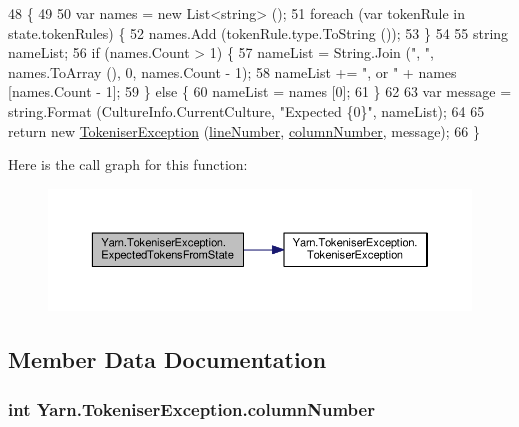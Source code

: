 \begin{DoxyCode}
48                                                                                                            
                       \{
49 
50             var names = \textcolor{keyword}{new} List<string> ();
51             \textcolor{keywordflow}{foreach} (var tokenRule \textcolor{keywordflow}{in} state.tokenRules) \{
52                 names.Add (tokenRule.type.ToString ());
53             \}
54 
55             \textcolor{keywordtype}{string} nameList;
56             \textcolor{keywordflow}{if} (names.Count > 1) \{
57                 nameList = String.Join (\textcolor{stringliteral}{", "}, names.ToArray (), 0, names.Count - 1);
58                 nameList += \textcolor{stringliteral}{", or "} + names [names.Count - 1];
59             \} \textcolor{keywordflow}{else} \{
60                 nameList = names [0];
61             \}
62 
63             var message = string.Format (CultureInfo.CurrentCulture, \textcolor{stringliteral}{"Expected \{0\}"}, nameList);
64 
65             \textcolor{keywordflow}{return} \textcolor{keyword}{new} \hyperlink{a00176_ad00fcf742d2b0d476ce43b27a3f3b6c1}{TokeniserException} (\hyperlink{a00176_a54b936d7b4f26f88a07a66c5fc1d1ad1}{lineNumber}, 
      \hyperlink{a00176_aabf2ad38f3984297c1daede9be55e3d6}{columnNumber}, message);
66         \}
\end{DoxyCode}


Here is the call graph for this function\-:
\nopagebreak
\begin{figure}[H]
\begin{center}
\leavevmode
\includegraphics[width=350pt]{a00176_af88cfa5eafdee355e1abb67e358497bd_cgraph}
\end{center}
\end{figure}




\subsection{Member Data Documentation}
\hypertarget{a00176_aabf2ad38f3984297c1daede9be55e3d6}{
\subsubsection[{column\-Number}]{\setlength{\rightskip}{0pt plus 5cm}int Yarn.\-Tokeniser\-Exception.\-column\-Number}}\label{a00176_aabf2ad38f3984297c1daede9be55e3d6}


